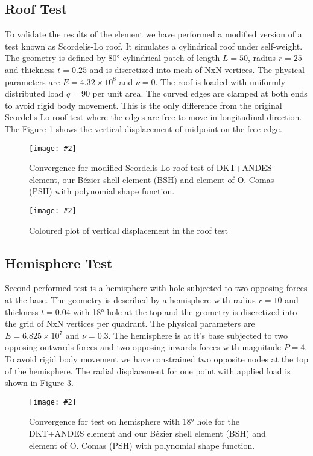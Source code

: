\documentclass{egpubl}
\newcommand{\Figure}[3]{%
\begin{figure}[htb]
  \centering
  \texttt{[image: \#2]}
  \caption{\label{fig-#2}#3}
\end{figure}}
\begin{document}
\subsection{Roof Test}\label{sec-roof}

To validate the results of the element we have performed a modified version
of a test known as Scordelis-Lo roof. It simulates a cylindrical roof under
self-weight. The geometry is defined by 80° cylindrical patch of length
$L=50$, radius $r=25$ and thickness $t=0.25$ and is discretized into
mesh of NxN vertices. The physical parameters are $E = 4.32 \times 10^8$ and
$\nu = 0$. The roof is loaded with uniformly distributed load $q = 90$ per
unit area. The curved edges are clamped at both ends to avoid rigid body
movement. This is the only difference from the original Scordelis-Lo roof test
where the edges are free to move in longitudinal direction. The Figure
\ref{fig-roof} shows the vertical displacement of midpoint on the free
edge.

\Figure{\linewidth}{roof}
{Convergence for modified Scordelis-Lo roof test of DKT+ANDES element, 
our B\'ezier shell element (BSH) and element of O. Comas (PSH) with polynomial shape function.}

\Figure{\linewidth}{roof-img}
{Coloured plot of vertical displacement in the roof test}


\subsection{Hemisphere Test}\label{sec-hemisphere}

Second performed test is a hemisphere with hole subjected to two opposing
forces at the base. The geometry is described by a hemisphere with radius
$r=10$ and thickness $t=0.04$ with 18° hole at the top and the geometry is
discretized into the grid of NxN vertices per quadrant. The physical
parameters are $E = 6.825 \times 10^7$ and $\nu = 0.3$. The hemisphere is
at it's base subjected to two opposing outwards forces and two opposing
inwards forces with magnitude $P = 4$. To avoid rigid body movement we have
constrained two opposite nodes at the top of the hemisphere. The radial
displacement for one point with applied load is shown in Figure
\ref{fig-hemisphere}.

\Figure{\linewidth}{hemisphere}
{Convergence for test on hemisphere with 18° hole for the DKT+ANDES element and
our B\'ezier shell element (BSH) and element of O. Comas (PSH) with polynomial shape function.}
\end{document}
